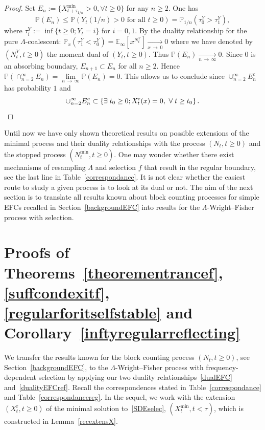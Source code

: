 \documentclass[10pt]{amsart}
\theoremstyle{definition}\newtheorem{defi}[theo]{Definition}\newtheorem{rema}[theo]{Remark}\newtheorem{exam}[theo]{Example}\newtheorem{exem}[theo]{Example}\newtheorem{nota}[theo]{Notation}
\newcommand{\rmr}{\mathrm{r}}
\newcommand{\bbE}{\mathbb{E}}
\newcommand{\bbP}{\mathbb{P}}
\let\oldexists\exists
\renewcommand*{\exists}{\mathrel{\oldexists}}
\let\oldforall\forall
\renewcommand*{\forall}{\mathrel{\oldforall}}
\begin{document}
\begin{proof}
Set $E_n:=\{X^{\min}_{t+\tau_{1/n}}>0, \forall t\geq 0\}$ for any $n\geq 2$. One has
\[
\bbP(E_n)\leq \bbP(Y_t(1/n)>0 \text{ for all } t\geq 0)=\bbP_{1/n}\left(\tau^Y_0>\tau^Y_1\right),
\]
where $\tau^Y_i:=\inf\{t\geq 0; Y_t=i\}$ for $i=0,1$. By the duality relationship for the pure $\Lambda$-coalescent: $\bbP_x(\tau^Y_1<\tau^Y_0)=\bbE_\infty[x^{N^{Y}_t}]\underset{x\,\rightarrow\,0}{\longrightarrow} 0$ where we have denoted by $(N_t^{Y},t\geq 0)$ the moment dual of $(Y_t,t\geq 0)$. Thus $\bbP(E_n)\underset{n\,\rightarrow\,\infty}{\longrightarrow} 0$. Since $0$ is an absorbing boundary, $E_{n+1}\subset E_n$ for all $n\geq 2$. Hence $\bbP\left(\cap_{n=2}^{\infty}E_n\right)=\underset{n\,\rightarrow\,\infty}{\lim} \bbP(E_n)=0.$ This allows us to conclude since $\cup_{n=2}^{\infty} E_n^{c}$ has probability $1$ and
\[
\cup_{n=2}^{\infty} E_n^{c}\subset \left\{\exists t_0\geq 0; X_t^{\rmr}(x)=0, \ \forall t\geq t_0\right\}.\qedhere
\]
\end{proof}

Until now we have only shown theoretical results on possible extensions of the minimal process and their duality relationships with the process $(N_t,t\geq 0)$ and the stopped process $(N^{\min}_{t},t\geq 0)$. One may wonder whether there exist mechanisms of resampling $\Lambda$ and selection $f$ that result in the regular boundary, see the last line in Table~\ref{correspondance}. It is not clear whether the easiest route to study a given process is to look at its dual or not. The aim of the next section is to translate all results known about block counting processes for simple EFCs recalled in Section~\ref{backgroundEFC} into results for the $\Lambda$-Wright--Fisher process with selection.


\section{Proofs of Theorems~\ref{theorementrancef}, \ref{suffcondexitf}, \ref{regularforitselfstable} and Corollary~\ref{inftyregularreflecting}}\label{application}


We transfer the results known for the block counting process $(N_t,t\geq 0)$, see Section~\ref{backgroundEFC}, to the $\Lambda$-Wright--Fisher process with frequency-dependent selection by applying our two duality relationships~\eqref{dualEFC} and~\eqref{dualityEFCref}. Recall the correspondences stated in Table~\ref{correspondance} and Table~\ref{correspondancereg}. In the sequel, we work with the extension $(X_t^{\rmr},t\geq 0)$ of the minimal solution to~\eqref{SDEselec}, $(X_t^{\min},t< \tau)$, which is constructed in Lemma~\ref{recextensX}.
\end{document}
